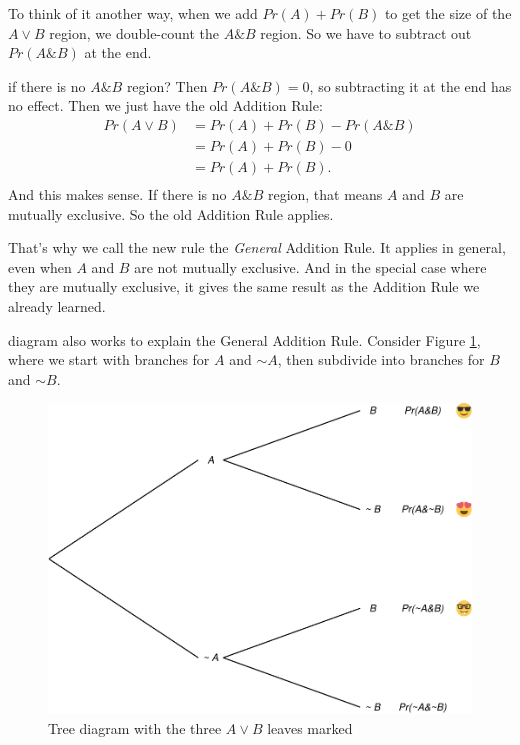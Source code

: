 \documentclass[justified]{tufte-book}
\renewcommand{\neg}{\mathbin{\sim}}
\renewcommand{\wedge}{\mathbin{\&}}
\newcommand{\p}{Pr}
\theoremstyle{definition}
\theoremstyle{definition}
\theoremstyle{definition}
\theoremstyle{definition}
\theoremstyle{remark}
\begin{document}
To think of it another way, when we add \(\p(A) + \p(B)\) to get the size of the \(A \vee B\) region, we double-count the \(A \wedge B\) region. So we have to subtract out \(\p(A \wedge B)\) at the end.

 if there is no \(A \wedge B\) region? Then \(\p(A \wedge B) = 0\), so subtracting it at the end has no effect. Then we just have the old Addition Rule:
\[
  \begin{aligned}
    \p(A \vee B) &= \p(A) + \p(B) - \p(A \wedge B)\\
                 &= \p(A) + \p(B) - 0\\
                 &= \p(A) + \p(B).\\
  \end{aligned}
\]
And this makes sense. If there is no \(A \wedge B\) region, that means \(A\) and \(B\) are mutually exclusive. So the old Addition Rule applies.

That's why we call the new rule the \emph{General} Addition Rule. It applies in general, even when \(A\) and \(B\) are not mutually exclusive. And in the special case where they are mutually exclusive, it gives the same result as the Addition Rule we already learned.

 diagram also works to explain the General Addition Rule. Consider Figure \ref{fig:gatree}, where we start with branches for \(A\) and \(\neg A\), then subdivide into branches for \(B\) and \(\neg B\).

\begin{figure}
\includegraphics{_main_files/figure-latex/gatree-1} \caption[Tree diagram with the three $A \vee B$ leaves marked]{Tree diagram with the three $A \vee B$ leaves marked}\label{fig:gatree}
\end{figure}
\end{document}
